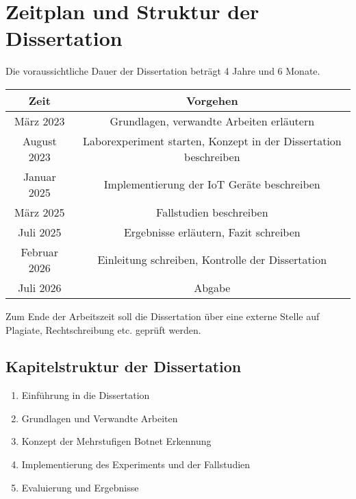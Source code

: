 \section{Zeitplan und Struktur der Dissertation}
\label{sec:plan}

Die voraussichtliche Dauer der Dissertation beträgt 4 Jahre und 6 Monate.

\begin{center}
    \begin{tabular}[c]{| c | c |}
        \hline
        \rowcolor{lightgray} Zeit & Vorgehen \\ [0.5ex]
        \hline
        März 2023 & Grundlagen, verwandte Arbeiten erläutern \\
        \hline
        August 2023 &  Laborexperiment starten, Konzept in der Dissertation beschreiben \\
        \hline
        Januar 2025 & Implementierung der IoT Geräte beschreiben \\
        \hline
        März 2025 & Fallstudien beschreiben \\
        \hline
        Juli 2025 & Ergebnisse erläutern, Fazit schreiben \\
        \hline
        Februar 2026 & Einleitung schreiben, Kontrolle der Dissertation \\
        \hline
        Juli 2026 & Abgabe \\
        \hline
    \end{tabular}
\end{center}

Zum Ende der Arbeitszeit soll die Dissertation über eine externe Stelle auf Plagiate, Rechtschreibung etc.
geprüft werden.

\subsection*{Kapitelstruktur der Dissertation}

\begin{enumerate}[label=\Roman*]
    \item Einführung in die Dissertation
    \item Grundlagen und Verwandte Arbeiten
    \item Konzept der Mehrstufigen Botnet Erkennung
    \item Implementierung des Experiments und der Fallstudien
    \item Evaluierung und Ergebnisse
\end{enumerate}

